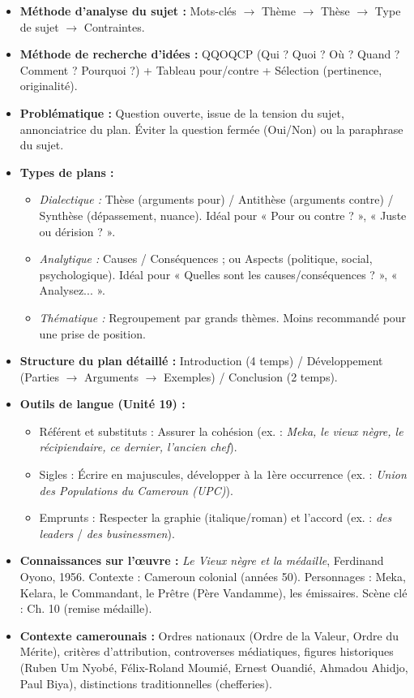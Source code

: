 \documentclass[11pt]{article}
\newcommand{\cle}[1]{{\popxbold\color{popdark}#1}}
\newcounter{popsec}
\newcounter{popsub}
\newcommand{\courssub}[1]{%
  \stepcounter{popsub}%
  \par\vspace{9pt}\noindent{\popxbold\fontsize{11.5}{13}\selectfont\color{popink}{\color{poporange}\thepopsec.\thepopsub}\hspace{6pt}#1}\par\nopagebreak\vspace{4pt}
}
\begin{document}
\courssub{Ressources à mobiliser}
\begin{itemize}
    \item \textbf{Méthode d'analyse du sujet :} Mots-clés $\to$ Thème $\to$ Thèse $\to$ Type de sujet $\to$ Contraintes.
    \item \textbf{Méthode de recherche d'idées :} QQOQCP (Qui ? Quoi ? Où ? Quand ? Comment ? Pourquoi ?) + Tableau pour/contre + Sélection (pertinence, originalité).
    \item \textbf{Problématique :} Question ouverte, issue de la tension du sujet, annonciatrice du plan. Éviter la question fermée (Oui/Non) ou la paraphrase du sujet.
    \item \textbf{Types de plans :}
    \begin{itemize}
        \item \emph{Dialectique :} Thèse (arguments pour) / Antithèse (arguments contre) / Synthèse (dépassement, nuance). Idéal pour « Pour ou contre ? », « Juste ou dérision ? ».
        \item \emph{Analytique :} Causes / Conséquences ; ou Aspects (politique, social, psychologique). Idéal pour « Quelles sont les causes/conséquences ? », « Analysez... ».
        \item \emph{Thématique :} Regroupement par grands thèmes. Moins recommandé pour une prise de position.
    \end{itemize}
    \item \textbf{Structure du plan détaillé :} Introduction (4 temps) / Développement (Parties $\to$ Arguments $\to$ Exemples) / Conclusion (2 temps).
    \item \textbf{Outils de langue (Unité 19) :}
    \begin{itemize}
        \item \cle{Référent et substituts :} Assurer la cohésion (ex. : \emph{Meka, le vieux nègre, le récipiendaire, ce dernier, l'ancien chef}).
        \item \cle{Sigles :} Écrire en majuscules, développer à la 1ère occurrence (ex. : \emph{Union des Populations du Cameroun (UPC)}).
        \item \cle{Emprunts :} Respecter la graphie (italique/roman) et l'accord (ex. : \emph{des leaders} / \emph{des businessmen}).
    \end{itemize}
    \item \textbf{Connaissances sur l'œuvre :} \emph{Le Vieux nègre et la médaille}, Ferdinand Oyono, 1956. Contexte : Cameroun colonial (années 50). Personnages : Meka, Kelara, le Commandant, le Prêtre (Père Vandamme), les émissaires. Scène clé : Ch. 10 (remise médaille).
    \item \textbf{Contexte camerounais :} Ordres nationaux (Ordre de la Valeur, Ordre du Mérite), critères d'attribution, controverses médiatiques, figures historiques (Ruben Um Nyobé, Félix-Roland Moumié, Ernest Ouandié, Ahmadou Ahidjo, Paul Biya), distinctions traditionnelles (chefferies).
\end{itemize}
\end{document}
